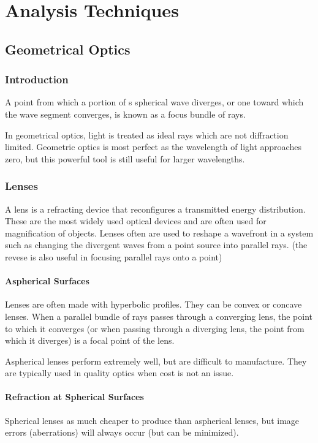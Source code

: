 \documentclass[12pt]{report}
\begin{document}
\part{Analysis Techniques}
\chapter{Geometrical Optics}

\section{Introduction}
A point from which a portion of s spherical wave diverges, or one toward which the wave segment converges, is known as a focus bundle of rays. 

In geometrical optics, light is treated as ideal rays which are not diffraction limited. Geometric optics is most perfect as the wavelength of light approaches zero, but this powerful tool is still useful for larger wavelengths. 

\section{Lenses}
A lens is a refracting device that reconfigures a transmitted energy distribution. These are the most widely used optical devices and are often used for magnification of objects. Lenses often are used to reshape a wavefront in a system such as changing the divergent waves from a point source into parallel rays. (the revese is also useful in focusing parallel rays onto a point)

\subsection{Aspherical Surfaces}
Lenses are often made with hyperbolic profiles. They can be convex or concave lenses. When a parallel bundle of rays passes through a converging lens, the point to which it converges (or when passing through a diverging lens, the point from which it diverges) is a focal point of the lens. 

Aspherical lenses perform extremely well, but are difficult to manufacture. They are typically used in quality optics when cost is not an issue. 

\subsection{Refraction at Spherical Surfaces}
Spherical lenses as much cheaper to produce than aspherical lenses, but image errors (aberrations) will always occur (but can be minimized).
\end{document}
